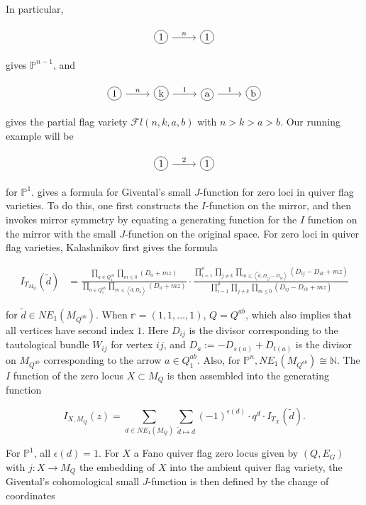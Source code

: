 \documentclass{amsart}
\newcommand*\circled[1]{\tikz[baseline=(char.base)]{
            \node[shape=circle,draw,inner sep=2pt] (char) {#1};}}
\newcommand{\PP}{\mathbb{P}}\newcommand{\A}{\mathbb{A}}\newcommand{\Z}{\mathbb{Z}}\newcommand{\C}{\mathbb{C}}\newcommand{\N}{\mathbb{N}}\newcommand{\T}{\mathbb{T}}
\begin{document}
In particular, 

\[
\begin{tikzcd}
\circled{1} \arrow[r,"n"] & \circled{1}
\end{tikzcd}\]

gives $\PP^{n-1}$, and 

\[ \begin{tikzcd}
\circled{1} \arrow[r,"n"] & \circled{k} \arrow[r,"1"] & \circled{a} \arrow[r,"1"] & \circled{b}
\end{tikzcd}\]

gives the partial flag variety $\mathcal{F}l(n,k,a,b)$ with $n>k>a>b$. Our running example will be 


\[
\begin{tikzcd}
\circled{1} \arrow[r,"2"] & \circled{1}
\end{tikzcd}\]

for $\PP^1$. \cite{Kalashnikov} gives a formula for Givental's small $J$-function for zero loci in quiver flag varieties. To do this, one first constructs the $I$-function on the mirror, and then invokes mirror symmetry by equating a generating function for the $I$ function on the mirror with the small $J$-function on the original space. For zero loci in quiver flag varieties, Kalashnikov first gives the formula 

\begin{align*}
    I_{T_{M_Q}}(\tilde{d}) &= \frac{ \prod_{a\in Q_1^{ab}} \prod_{m\leq 0} (D_a + mz) }{ \prod_{a\in Q_1^{ab}} \prod_{m\leq \left< \tilde{d}, D_a \right>} (D_a + mz) } \cdot \frac{ \prod_{i=1}^\rho \prod_{j\neq k} \prod_{m\leq \left< \tilde{d}, D_{ij}-D_{ik} \right>} (D_{ij} - D_{ik} + mz ) }{ \prod_{i=1}^\rho \prod_{j\neq k} \prod_{m\leq 0} (D_{ij} - D_{ik} + mz ) }
    \end{align*}

for $\tilde{d} \in NE_1(M_{Q^{ab}})$.  When $\mathbb{r}=(1,1,\dots, 1)$, $Q = Q^{ab}$, which also implies that all vertices have second index $1$. Here $D_{ij}$ is the divisor corresponding to the tautological bundle $W_{ij}$ for vertex $ij$, and $D_a := -D_{s(a)} + D_{t(a)}$ is the divisor on $M_{Q^{ab}}$ corresponding to the arrow $a \in Q_1^{ab}$. Also, for $\PP^n, NE_1(M_{Q^{ab}}) \cong \N$. The $I$ function of the zero locus $X \subset M_Q$ is then assembled into the generating function

\[ I_{X, M_Q}(z) = \sum_{d \in NE_1(M_Q)} \sum_{\tilde{d}\mapsto d} (-1)^{\epsilon(d)} \cdot q^d \cdot I_{T_X}(\tilde{d}). \] 

For $\PP^1$, all $\epsilon(d)=1$. For $X$ a Fano quiver flag zero locus given by $(Q,E_G)$ with $j: X\rightarrow M_Q$ the embedding of $X$ into the ambient quiver flag variety, the Givental's cohomological small $J$-function is then defined by the change of coordinates
\end{document}
